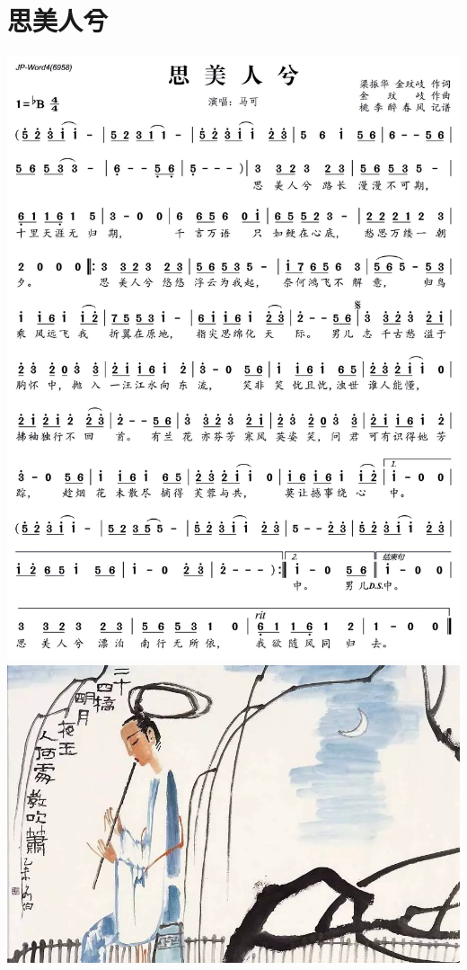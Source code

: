 \documentclass[cn,pad,chinesefont=nofont,twocol]{elegantbook}
\begin{document}
\section{思美人兮}
    \includegraphics[width=\textwidth]{dongxiao/20200402-思美人.jpg}
\newpage
\pagestyle{empty}
\vspace*{5cm}
\includegraphics[width=\textwidth]{cover3.jpg} 
\end{document}
